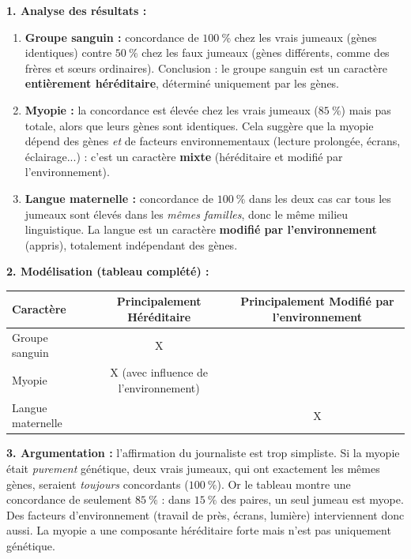 \documentclass[11pt]{article}
\begin{document}
\begin{corrige}
\textbf{1. Analyse des résultats :}
\begin{enumerate}
    \item \textbf{Groupe sanguin :} concordance de $100\ \%$ chez les vrais jumeaux (gènes identiques) contre $50\ \%$ chez les faux jumeaux (gènes différents, comme des frères et sœurs ordinaires). Conclusion : le groupe sanguin est un caractère \textbf{entièrement héréditaire}, déterminé uniquement par les gènes.
    \item \textbf{Myopie :} la concordance est élevée chez les vrais jumeaux ($85\ \%$) mais pas totale, alors que leurs gènes sont identiques. Cela suggère que la myopie dépend des gènes \emph{et} de facteurs environnementaux (lecture prolongée, écrans, éclairage...) : c'est un caractère \textbf{mixte} (héréditaire et modifié par l'environnement).
    \item \textbf{Langue maternelle :} concordance de $100\ \%$ dans les deux cas car tous les jumeaux sont élevés dans les \emph{mêmes familles}, donc le même milieu linguistique. La langue est un caractère \textbf{modifié par l'environnement} (appris), totalement indépendant des gènes.
\end{enumerate}

\textbf{2. Modélisation (tableau complété) :}
\begin{center}
\begin{tabular}{|l|c|c|}\hline
\textbf{Caractère} & \textbf{Principalement Héréditaire} & \textbf{Principalement Modifié par l'environnement} \\ \hline
Groupe sanguin & X & \\ \hline
Myopie & X (avec influence de l'environnement) & \\ \hline
Langue maternelle & & X \\ \hline
\end{tabular}
\end{center}

\textbf{3. Argumentation :} l'affirmation du journaliste est trop simpliste. Si la myopie était \emph{purement} génétique, deux vrais jumeaux, qui ont exactement les mêmes gènes, seraient \emph{toujours} concordants ($100\ \%$). Or le tableau montre une concordance de seulement $85\ \%$ : dans $15\ \%$ des paires, un seul jumeau est myope. Des facteurs d'environnement (travail de près, écrans, lumière) interviennent donc aussi. La myopie a une composante héréditaire forte mais n'est pas \og uniquement \fg{} génétique.


\end{corrige}
\end{document}
